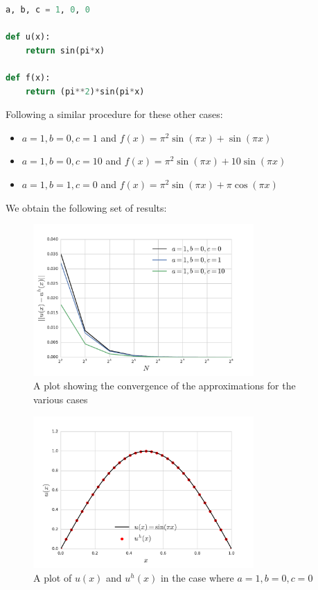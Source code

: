 \begin{lstlisting}[language=Python]
a, b, c = 1, 0, 0

def u(x):
    return sin(pi*x)

def f(x):
    return (pi**2)*sin(pi*x)
\end{lstlisting}

Following a similar procedure for these other cases:
\begin{itemize}
    \item $a = 1, b = 0, c = 1$ and
          $f(x) = \pi^2\sin{(\pi x)} + \sin{(\pi x)}$ \\
    \item $a = 1, b = 0, c = 10$ and
          $f(x) = \pi^2\sin{(\pi x)} + 10\sin{(\pi x)}$ \\
    \item $a = 1, b = 1, c = 0$ and
          $f(x) = \pi^2\sin{(\pi x)} + \pi\cos{(\pi x)}$
\end{itemize}

We obtain the following set of results:

%    

\begin{figure}
    \centering
    \includegraphics[width=0.75\textwidth]{img/one-d-deterministic-error.pdf}
    \caption{A plot showing the convergence of the approximations for the
             various cases}
\end{figure}

\begin{figure}
    \centering
    \includegraphics[width=0.75\textwidth]{img/oned-deterministic-plot.pdf}
    \caption{A plot of $u(x)$ and $u^h(x)$ in the case where $a=1, b=0, c=0$}
\end{figure}
